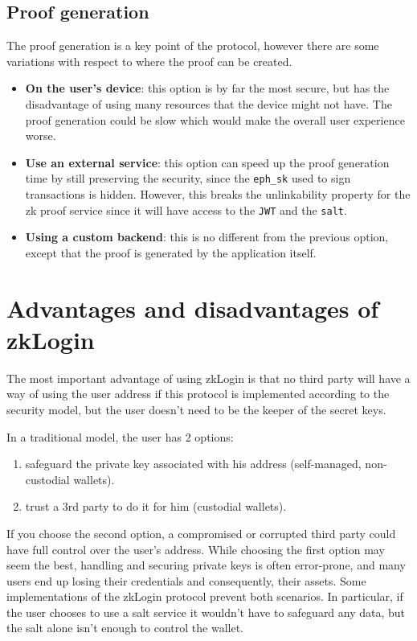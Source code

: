 \documentclass{article}
\begin{document}
\subsection{Proof generation}
The proof generation is a key point of the protocol, however there are some variations with respect to where the proof can be created.
\begin{itemize}
    \item \textbf{On the user's device}: this option is by far the most secure, but has the disadvantage of using many resources that the device might not have. The proof generation could be slow which would make the overall user experience worse.
    \item \textbf{Use an external service}: this option can speed up the proof generation time by still preserving the security, since the \texttt{eph\_sk} used to sign transactions is hidden. However, this breaks the unlinkability property for the zk proof service since it will have access to the \texttt{JWT} and the \texttt{salt}.
    \item \textbf{Using a custom backend}: this is no different from the previous option, except that the proof is generated by the application itself.
\end{itemize}

\section{Advantages and disadvantages of zkLogin}
The most important advantage of using zkLogin is that no third party will have a way of using the user address if this protocol is implemented according to the security model, but the user doesn't need to be the keeper of the secret keys.

In a traditional model, the user has 2 options:
\begin{enumerate}
    \item safeguard the private key associated with his address (self-managed, non-custodial wallets).
    \item trust a 3rd party to do it for him (custodial wallets).
\end{enumerate}

If you choose the second option, a compromised or corrupted third party could have full control over the user's address. While choosing the first option may seem the best, handling and securing private keys is often error-prone, and many users end up losing their credentials and consequently, their assets. Some implementations of the zkLogin protocol prevent both scenarios. In particular, if the user chooses to use a salt service it wouldn't have to safeguard any data, but the salt alone isn't enough to control the wallet.
\end{document}
